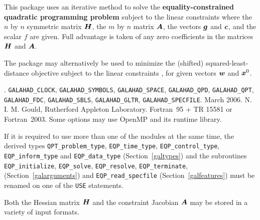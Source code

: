 \documentclass{galahad}
\newcommand{\packagename}{EQP}
\newcommand{\fullpackagename}{\libraryname\_\packagename}
\begin{document}
\galheader


\galsummary
This package uses an iterative method
to solve the {\bf equality-constrained quadratic programming problem}
subject to the linear constraints
where the $n$ by $n$ symmetric matrix ${\bm{H}}$, the $m$ by $n$ matrix ${\bm{A}}$, 
the  vectors ${\bm{g}}$ and ${\bm{c}}$, and the scalar $f$ are given.
Full advantage is taken of any zero coefficients in the matrices ${\bm{H}}$ 
and ${\bm{A}}$.

The package may alternatively be used to minimize the (shifted) 
squared-least-distance objective
subject to the linear constraints , 
for given vectors ${\bm{w}}$ and ${\bm{x}}^{0}$.


\galattributes
\galversions{\tt  \fullpackagename\_single, \fullpackagename\_double}.
\galuses 
{\tt GALAHAD\_\-CLOCK},
{\tt GALAHAD\_SY\-M\-BOLS}, 
{\tt GALAHAD\-\_\-SPACE}, 
{\tt GALAHAD\_QPD},
{\tt GALAHAD\_QPT},
{\tt GALAHAD\_FDC},
{\tt GALAHAD\_SBLS}, 
{\tt GALAHAD\_GLTR}, 
{\tt GALAHAD\_SPECFILE}.
\galdate March 2006.
\galorigin N. I. M. Gould, Rutherford Appleton Laboratory.
\gallanguage Fortran~95 + TR 15581 or Fortran~2003. 
\galparallelism Some options may use OpenMP and its runtime library.


\galhowto



\noindent
If it is required to use more than one of the modules at the same time, 
the derived types
{\tt QPT\_problem\_type}, 
{\tt \packagename\_time\_type}, 
{\tt \packagename\_\-control\-\_type}, 
{\tt \packagename\_inform\_type} 
and
{\tt \packagename\_data\_type}
(Section~\ref{galtypes})
and the subroutines
{\tt \packagename\_initialize}, 
{\tt \packagename\_\-solve},
{\tt \packagename\_\-resolve},
{\tt \packagename\_\-terminate},
(Section~\ref{galarguments})
and 
{\tt \packagename\_read\_specfile}
(Section~\ref{galfeatures})
must be renamed on one of the {\tt USE} statements.


\galmatrix
Both the Hessian matrix ${\bm{H}}$ and the constraint Jacobian ${\bm{A}}$
may be stored in a variety of input formats.
\end{document}
